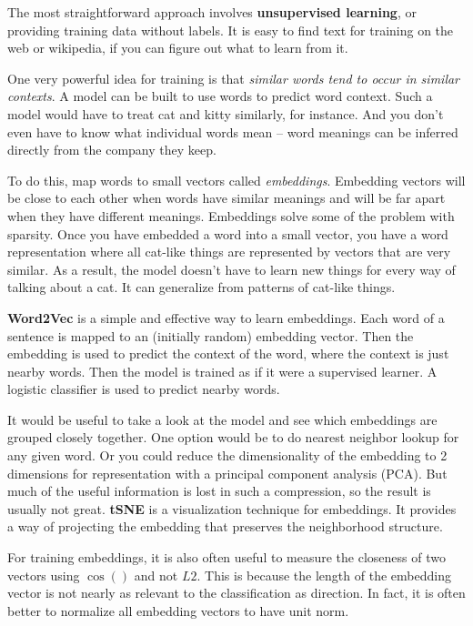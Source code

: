 The most straightforward approach involves \textbf{unsupervised learning}, or providing training data without labels. It is easy to find text for training on the web or wikipedia, if you can figure out what to learn from it. 

One very powerful idea for training is that \textit{similar words tend to occur in similar contexts}. A model can be built to use words to predict word context. Such a model would have to treat cat and kitty similarly, for instance. And you don't even have to know what individual words mean -- word meanings can be inferred directly from the company they keep. 

To do this, map words to small vectors called \textit{embeddings}. Embedding vectors will be close to each other when words have similar meanings and will be far apart when they have different meanings. Embeddings solve some of the problem with sparsity. Once you have embedded a word into a small vector, you have a word representation where all cat-like things are represented by vectors that are very similar. As a result, the model doesn't have to learn new things for every way of talking about a cat. It can generalize from patterns of cat-like things. 

\textbf{Word2Vec} is a simple and effective way to learn embeddings. Each word of a sentence is mapped to an (initially random) embedding vector. Then the embedding is used to predict the context of the word, where the context is just nearby words. Then the model is trained as if it were a supervised learner. A logistic classifier is used to predict nearby words. 

It would be useful to take a look at the model and see which embeddings are grouped closely together. One option would be to do nearest neighbor lookup for any given word. Or you could reduce the dimensionality of the embedding to 2 dimensions for representation with a principal component analysis (PCA). But much of the useful information is lost in such a compression, so the result is usually not great. \textbf{tSNE} is a visualization technique for embeddings. It provides a way of projecting the embedding that preserves the neighborhood structure. 

For training embeddings, it is also often useful to measure the closeness of two vectors using $\cos()$ and not $L2$. This is because the length of the embedding vector is not nearly as relevant to the classification as direction. In fact, it is often better to normalize all embedding vectors to have unit norm. 

